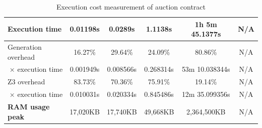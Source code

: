 \documentclass[english,runningheads]{llncs}
\begin{document}
\begin{table}[]
{\begin{tabular}{l||lllll}
\textbf{Execution time}                & \multicolumn{1}{c|}{0.01198s}   & \multicolumn{1}{c|}{0.0289s}   & \multicolumn{1}{c|}{1.1138s}   & \multicolumn{1}{c|}{1h 5m 45.1377s} & \multicolumn{1}{c}{\color[HTML]{888888} N/A} \\ \hline
Generation overhead                    & \multicolumn{1}{c|}{16.27\%}    & \multicolumn{1}{c|}{29.64\%}   & \multicolumn{1}{c|}{24.09\%}   & \multicolumn{1}{c|}{80.86\%}        & \multicolumn{1}{c}{\color[HTML]{888888} N/A} \\ \hline
\multicolumn{1}{r||}{× execution time} & \multicolumn{1}{c|}{0.001949s}  & \multicolumn{1}{c|}{0.008566s} & \multicolumn{1}{c|}{0.268314s} & \multicolumn{1}{c|}{53m 10.038344s} & \multicolumn{1}{c}{\color[HTML]{888888} N/A} \\ \hline
Z3 overhead                            & \multicolumn{1}{c|}{83.73\%}    & \multicolumn{1}{c|}{70.36\%}   & \multicolumn{1}{c|}{75.91\%}   & \multicolumn{1}{c|}{19.14\%}        & \multicolumn{1}{c}{\color[HTML]{888888} N/A} \\ \hline
\multicolumn{1}{r||}{× execution time} & \multicolumn{1}{c|}{0.010031s}  & \multicolumn{1}{c|}{0.020334s} & \multicolumn{1}{c|}{0.845486s} & \multicolumn{1}{c|}{12m 35.099356s} & \multicolumn{1}{c}{\color[HTML]{888888} N/A} \\ \hline
\textbf{RAM usage peak}                & \multicolumn{1}{c|}{17,020KB}   & \multicolumn{1}{c|}{17,740KB}  & \multicolumn{1}{c|}{49,668KB}  & \multicolumn{1}{c|}{2,364,500KB}    & \multicolumn{1}{c}{\color[HTML]{888888} N/A}
\end{tabular}
}
\caption{Execution cost measurement of auction contract\label{table1}}
\end{table}
\end{document}
